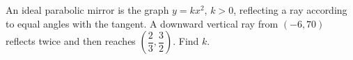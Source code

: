An ideal parabolic mirror is the graph $y=kx^2$, $k>0$, reflecting a ray according to equal angles with the tangent. A downward vertical ray from $(-6,70)$ reflects twice and then reaches $(\dfrac{2}{3} , \dfrac{3}{2})$. Find $k$.
